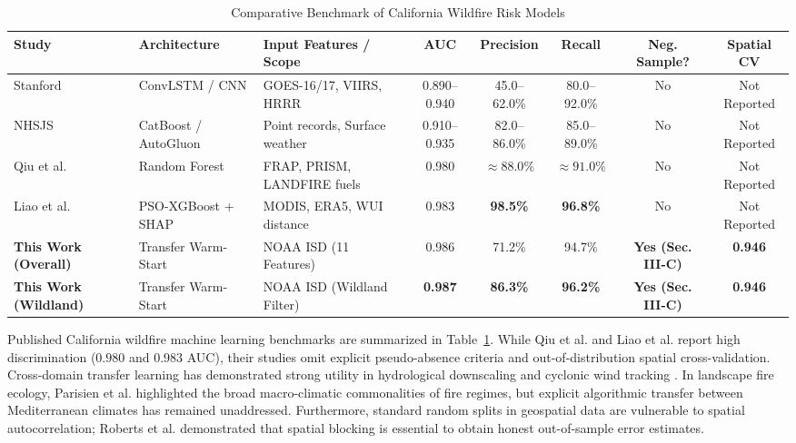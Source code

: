 \documentclass[journal]{IEEEtran}
\begin{document}
\begin{table}[t]
\caption{\color{Burgundy}Comparative Benchmark of California Wildfire Risk Models}
\label{tab:benchmarks}
\centering
{}
\begin{tabular}{lllccccc}
\toprule
\rowcolor{LightGold}
\textbf{\color{Burgundy}Study} & \textbf{\color{Burgundy}Architecture} & \textbf{\color{Burgundy}Input Features / Scope} & \textbf{\color{Burgundy}AUC} & \textbf{\color{Burgundy}Precision} & \textbf{\color{Burgundy}Recall} & \textbf{\color{Burgundy}Neg. Sample?} & \textbf{\color{Burgundy}Spatial CV} \\
\midrule
Stanford \cite{stanford2023} & ConvLSTM / CNN & GOES-16/17, VIIRS, HRRR & 0.890--0.940 & 45.0--62.0\% & 80.0--92.0\% & No & Not Reported \\
NHSJS \cite{nhjs2023} & CatBoost / AutoGluon & Point records, Surface weather & 0.910--0.935 & 82.0--86.0\% & 85.0--89.0\% & No & Not Reported \\
Qiu et al. \cite{qiu2023} & Random Forest & FRAP, PRISM, LANDFIRE fuels & 0.980 & $\approx 88.0\%$ & $\approx 91.0\%$ & No & Not Reported \\
Liao et al. \cite{liao2024} & PSO-XGBoost + SHAP & MODIS, ERA5, WUI distance & 0.983 & \textbf{98.5\%} & \textbf{96.8\%} & No & Not Reported \\
\midrule
\rowcolor{LightGold}
\textbf{\color{Maroon}This Work (Overall)} & Transfer Warm-Start & NOAA ISD (11 Features) & 0.986 & 71.2\% & 94.7\% & \textbf{Yes (Sec. III-C)} & \textbf{0.946} \\
\rowcolor{LightGold}
\textbf{\color{Maroon}This Work (Wildland)} & Transfer Warm-Start & NOAA ISD (Wildland Filter) & \textbf{0.987} & \textbf{86.3\%} & \textbf{96.2\%} & \textbf{Yes (Sec. III-C)} & \textbf{0.946} \\
\bottomrule
\end{tabular}
\end{table}

Published California wildfire machine learning benchmarks are summarized in Table~\ref{tab:benchmarks}. While Qiu et al. \cite{qiu2023} and Liao et al. \cite{liao2024} report high discrimination ($0.980$ and $0.983$ AUC), their studies omit explicit pseudo-absence criteria and out-of-distribution spatial cross-validation. Cross-domain transfer learning has demonstrated strong utility in hydrological downscaling \cite{vandal2017} and cyclonic wind tracking \cite{keisler2020}. In landscape fire ecology, Parisien et al. \cite{parisien2021} highlighted the broad macro-climatic commonalities of fire regimes, but explicit algorithmic transfer between Mediterranean climates has remained unaddressed. Furthermore, standard random splits in geospatial data are vulnerable to spatial autocorrelation; Roberts et al. \cite{roberts2017cross} demonstrated that spatial blocking is essential to obtain honest out-of-sample error estimates.
\end{document}
